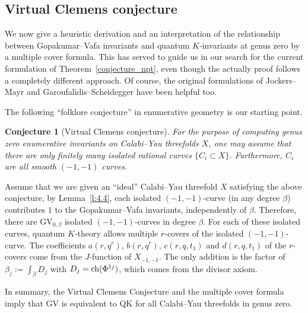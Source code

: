 \documentclass[11pt]{amsart}
\newtheorem{conjecture}[theorem]{Conjecture}
\newtheorem*{main theorem*}{Main Theorem}
\theoremstyle{remark}
\numberwithin{equation}{section}
\newcommand{\ch}{{\rm ch}}
\newcommand{\GV}{{\mathrm{GV}}}
\begin{document}
\subsection{Virtual Clemens conjecture}

We now give a heuristic derivation and an interpretation of the relationship between Gopakumar--Vafa invariants and quantum $K$-invariants at genus zero by a multiple cover formula. This has served to guide us in our search for the current formulation of %
Theorem~\ref{conjecture_npt}, even though the actually proof follows a completely different approach. Of course, the original formulations of Jockers--Mayr \cite{Jockers_Mayr_2019} and Garoufalidis--Scheidegger \cite{Garoufalidis_Scheidegger_2022} have been helpful too.

The following ``folklore conjecture'' in enumerative geometry is our starting point.

\begin{conjecture}[Virtual Clemens conjecture]
For the purpose of computing genus zero enumerative invariants on Calabi--Yau threefolds $X$, one may assume that there are only finitely many isolated rational curves $\{C_i \subset X \}$. Furthermore, $C_i$ are all smooth $(-1,-1)$ curves. 
\end{conjecture}

Assume that we are given an ``ideal'' Calabi--Yau threefold $X$ satisfying the above conjecture, by Lemma~\ref{l:4.4}, each isolated $(-1,-1)$-curve (in any degree $\beta$) contributes $1$ to the Gopakumar--Vafa invariants, independently of $\beta$. Therefore, there are $\GV_{0,\beta}$ isolated $(-1,-1)$-curves in degree $\beta$. For each of these isolated curves, quantum $K$-theory allows multiple $r$-covers of the isolated $(-1,-1)$-curve. The coefficients $a(r, q^r)$, $b(r,q^r)$, $c(r,q,t_1)$ and $d(r,q,t_1)$ of the $r$-covers come from the $J$-function of $X_{-1,-1}$. The only addition is the factor of $\beta_j:=\int_{\beta} D_j$ with $D_j = \ch(\Phi^{1j})$, which comes from the divisor axiom.

In summary, the Virtual Clemens Conjecture and the multiple cover formula imply that GV is equivalent to QK for all Calabi--Yau threefolds in genus zero.




    

%
    

    
\end{document}
